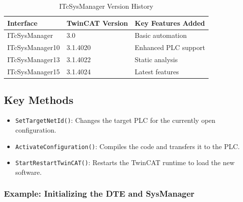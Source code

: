 \documentclass[11pt,a4paper]{article}
\begin{document}
\begin{table}[h]
\centering
\begin{tabular}{@{}lll@{}}
\toprule
\textbf{Interface} & \textbf{TwinCAT Version} & \textbf{Key Features Added} \\
\midrule
ITcSysManager & 3.0 & Basic automation \\
ITcSysManager10 & 3.1.4020 & Enhanced PLC support \\
ITcSysManager13 & 3.1.4022 & Static analysis \\
ITcSysManager15 & 3.1.4024 & Latest features \\
\bottomrule
\end{tabular}
\caption{ITcSysManager Version History}
\end{table}

\subsection{Key Methods}

\begin{itemize}[leftmargin=*]
    \item \texttt{SetTargetNetId()}: Changes the target PLC for the currently open configuration.
    \item \texttt{ActivateConfiguration()}: Compiles the code and transfers it to the PLC.
    \item \texttt{StartRestartTwinCAT()}: Restarts the TwinCAT runtime to load the new software.
\end{itemize}

\subsubsection*{Example: Initializing the DTE and SysManager}
\end{document}
